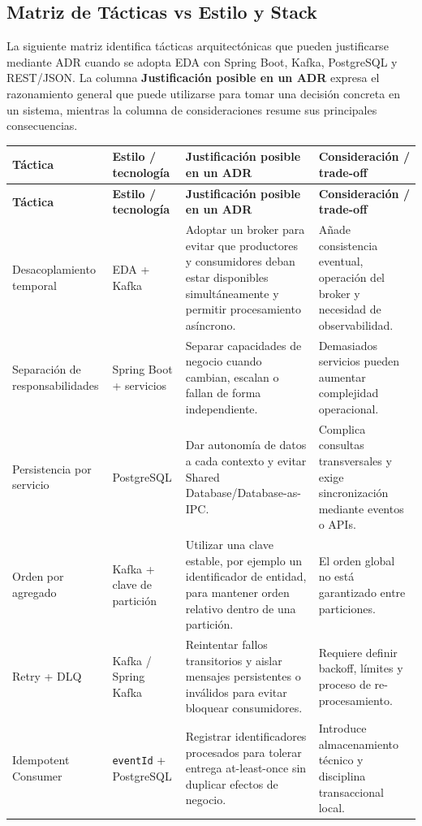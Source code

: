 \documentclass[12pt,a4paper]{article}
\begin{document}
\subsection{Matriz de Tácticas vs Estilo y Stack}

La siguiente matriz identifica tácticas arquitectónicas que pueden justificarse mediante ADR cuando se adopta EDA con Spring Boot, Kafka, PostgreSQL y REST/JSON. La columna \textbf{Justificación posible en un ADR} expresa el razonamiento general que puede utilizarse para tomar una decisión concreta en un sistema, mientras la columna de consideraciones resume sus principales consecuencias.

\scriptsize
\setlength{\tabcolsep}{3pt}
\begin{longtable}{P{0.16\textwidth} P{0.18\textwidth} P{0.36\textwidth} P{0.20\textwidth}}
\toprule
\textbf{Táctica} & \textbf{Estilo / tecnología} & \textbf{Justificación posible en un ADR} & \textbf{Consideración / trade-off} \\
\midrule
\endfirsthead
\toprule
\textbf{Táctica} & \textbf{Estilo / tecnología} & \textbf{Justificación posible en un ADR} & \textbf{Consideración / trade-off} \\
\midrule
\endhead
Desacoplamiento temporal & EDA + Kafka & Adoptar un broker para evitar que productores y consumidores deban estar disponibles simultáneamente y permitir procesamiento asíncrono. & Añade consistencia eventual, operación del broker y necesidad de observabilidad. \\
Separación de responsabilidades & Spring Boot + servicios & Separar capacidades de negocio cuando cambian, escalan o fallan de forma independiente. & Demasiados servicios pueden aumentar complejidad operacional. \\
Persistencia por servicio & PostgreSQL & Dar autonomía de datos a cada contexto y evitar Shared Database/Database-as-IPC. & Complica consultas transversales y exige sincronización mediante eventos o APIs. \\
Orden por agregado & Kafka + clave de partición & Utilizar una clave estable, por ejemplo un identificador de entidad, para mantener orden relativo dentro de una partición. & El orden global no está garantizado entre particiones. \\
Retry + DLQ & Kafka / Spring Kafka & Reintentar fallos transitorios y aislar mensajes persistentes o inválidos para evitar bloquear consumidores. & Requiere definir backoff, límites y proceso de re-procesamiento. \\
Idempotent Consumer & \texttt{eventId} + PostgreSQL & Registrar identificadores procesados para tolerar entrega at-least-once sin duplicar efectos de negocio. & Introduce almacenamiento técnico y disciplina transaccional local. \\

\end{longtable}
\end{document}
